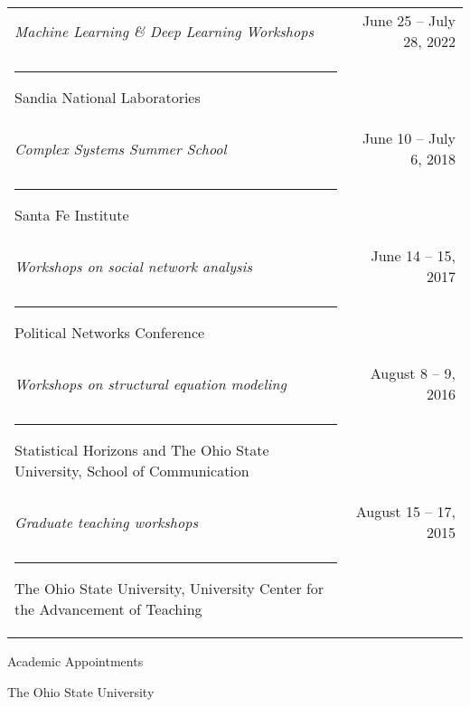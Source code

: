 \documentclass[letterpaper, 10pt]{extarticle}
\renewenvironment{itemize}{
  \begin{list}{}{
    \setlength{\leftmargin}{10pt}
  }
}{
  \end{list}
}
\begin{document}
\vspace{1em}
\begin{tabularx}{\textwidth}{Xr}
\textit{Machine Learning \& Deep Learning Workshops} & June 25 -- July 28, 2022\\
\rule{0.75em}{0pt}Sandia National Laboratories\vspace{0.5em}\\
\textit{Complex Systems Summer School} & June 10 -- July 6, 2018\\
\rule{0.75em}{0pt}Santa Fe Institute\vspace{0.5em}\\
\textit{Workshops on social network analysis} & June 14 -- 15, 2017\\
\rule{0.75em}{0pt}Political Networks Conference\vspace{0.5em}\\
\textit{Workshops on structural equation modeling} & August 8 -- 9, 2016\\
\rule{0.75em}{0pt}Statistical Horizons and The Ohio State University, School of Communication\vspace{0.5em}\\
\textit{Graduate teaching workshops} & August 15 -- 17, 2015\\
\rule{0.75em}{0pt}The Ohio State University, University Center for the Advancement of Teaching\\
\end{tabularx}

\vspace{1em}
{\large Academic Appointments}

\begin{itemize}
\item The Ohio State University
\end{itemize}
\end{document}
